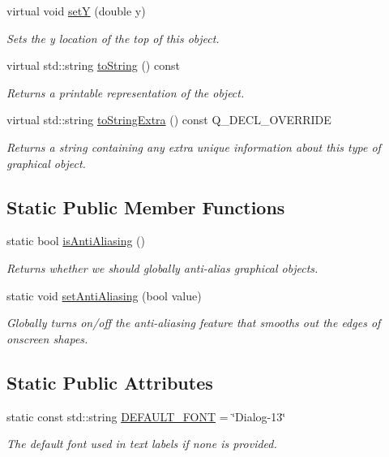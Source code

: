 \begin{DoxyCompactItemize}
virtual void \mbox{\hyperlink{classGObject_a7d57e2a5c35d27feb58fd498a3cf82b9}{setY}} (double y)
\begin{DoxyCompactList}\small\item\em Sets the y location of the top of this object. \end{DoxyCompactList}\item 
virtual std\+::string \mbox{\hyperlink{classGObject_a1fe5121d6528fdea3f243321b3fa3a49}{to\+String}} () const
\begin{DoxyCompactList}\small\item\em Returns a printable representation of the object. \end{DoxyCompactList}\item 
virtual std\+::string \mbox{\hyperlink{classGText_a85b5bcebac42ec5f130b0c3851383a23}{to\+String\+Extra}} () const Q\+\_\+\+D\+E\+C\+L\+\_\+\+O\+V\+E\+R\+R\+I\+DE
\begin{DoxyCompactList}\small\item\em Returns a string containing any extra unique information about this type of graphical object. \end{DoxyCompactList}\end{DoxyCompactItemize}
\subsection*{Static Public Member Functions}
\begin{DoxyCompactItemize}
\item 
static bool \mbox{\hyperlink{classGObject_a93be0e1fe1b1bf1a1da732470c94f42b}{is\+Anti\+Aliasing}} ()
\begin{DoxyCompactList}\small\item\em Returns whether we should globally anti-\/alias graphical objects. \end{DoxyCompactList}\item 
static void \mbox{\hyperlink{classGObject_a1e43371668ae850193cebedb44e1bbe3}{set\+Anti\+Aliasing}} (bool value)
\begin{DoxyCompactList}\small\item\em Globally turns on/off the anti-\/aliasing feature that smooths out the edges of onscreen shapes. \end{DoxyCompactList}\end{DoxyCompactItemize}
\subsection*{Static Public Attributes}
\begin{DoxyCompactItemize}
\item 
static const std\+::string \mbox{\hyperlink{classGText_ab265ee508af32c0c0bb1aa3693977247}{D\+E\+F\+A\+U\+L\+T\+\_\+\+F\+O\+NT}} = \char`\"{}Dialog-\/13\char`\"{}
\begin{DoxyCompactList}\small\item\em The default font used in text labels if none is provided. \end{DoxyCompactList}\end{DoxyCompactItemize}
